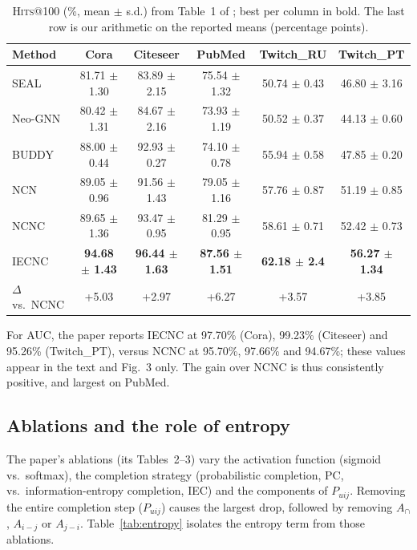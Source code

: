 \documentclass[11pt,a4paper]{article}
\makeatletter
\newcommand{\hits}{\textsc{Hits}@100}
\makeatother
\begin{document}
\begin{table}[t]
\centering
\caption{\hits{} (\%, mean $\pm$ s.d.) from Table~1 of \cite{zhou2025iecnc}; best per column in bold.
The last row is our arithmetic on the reported means (percentage points).}
\label{tab:results}
\small
\begin{tabular}{@{}lccccc@{}}
\toprule
\textbf{Method} & \textbf{Cora} & \textbf{Citeseer} & \textbf{PubMed} & \textbf{Twitch\_RU} & \textbf{Twitch\_PT}\\
\midrule
SEAL    & 81.71 $\pm$ 1.30 & 83.89 $\pm$ 2.15 & 75.54 $\pm$ 1.32 & 50.74 $\pm$ 0.43 & 46.80 $\pm$ 3.16\\
Neo-GNN & 80.42 $\pm$ 1.31 & 84.67 $\pm$ 2.16 & 73.93 $\pm$ 1.19 & 50.52 $\pm$ 0.37 & 44.13 $\pm$ 0.60\\
BUDDY   & 88.00 $\pm$ 0.44 & 92.93 $\pm$ 0.27 & 74.10 $\pm$ 0.78 & 55.94 $\pm$ 0.58 & 47.85 $\pm$ 0.20\\
NCN     & 89.05 $\pm$ 0.96 & 91.56 $\pm$ 1.43 & 79.05 $\pm$ 1.16 & 57.76 $\pm$ 0.87 & 51.19 $\pm$ 0.85\\
NCNC    & 89.65 $\pm$ 1.36 & 93.47 $\pm$ 0.95 & 81.29 $\pm$ 0.95 & 58.61 $\pm$ 0.71 & 52.42 $\pm$ 0.73\\
\midrule
IECNC   & \textbf{94.68 $\pm$ 1.43} & \textbf{96.44 $\pm$ 1.63} & \textbf{87.56 $\pm$ 1.51} & \textbf{62.18 $\pm$ 2.4} & \textbf{56.27 $\pm$ 1.34}\\
$\Delta$ vs.\ NCNC & +5.03 & +2.97 & +6.27 & +3.57 & +3.85\\
\bottomrule
\end{tabular}
\end{table}

For AUC, the paper reports IECNC at 97.70\% (Cora), 99.23\% (Citeseer) and 95.26\% (Twitch\_PT),
versus NCNC at 95.70\%, 97.66\% and 94.67\%; these values appear in the text and Fig.~3 only.
The gain over NCNC is thus consistently positive, and largest on PubMed.

\subsection{Ablations and the role of entropy}
The paper's ablations (its Tables~2--3) vary the activation function (sigmoid vs.\ softmax),
the completion strategy (probabilistic completion, PC, vs.\ information-entropy completion, IEC) and the components of $P_{uij}$.
Removing the entire completion step ($P_{uij}$) causes the largest drop, followed by removing
$A_\cap$, $A_{i-j}$ or $A_{j-i}$. Table~\ref{tab:entropy} isolates the entropy term from those ablations.
\end{document}
